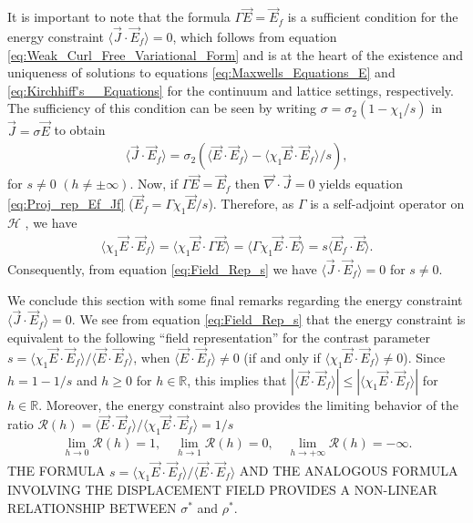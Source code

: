 \documentclass{cmslatex}
\begin{document}
It is important to note that the formula $\Gamma\vec{E}=\vec{E}_f$ is a
sufficient condition for the energy constraint
$\langle\vec{J}\cdot\vec{E}_f\rangle=0$, which follows from equation
\eqref{eq:Weak_Curl_Free_Variational_Form} and is at the heart of
the existence and uniqueness of solutions to equations
\eqref{eq:Maxwells_Equations_E} and 
\eqref{eq:Kirchhiff's__Equations} for the continuum and lattice
settings, respectively. The sufficiency of this condition can be seen
by writing $\sigma=\sigma_2(1-\chi_1/s)$ in $\vec{J}=\sigma\vec{E}$ to obtain       
% 
\begin{align}\label{eq:Field_Rep_s}
  \langle\vec{J}\cdot\vec{E}_f\rangle=\sigma_2(\langle\vec{E}\cdot\vec{E}_f\rangle-\langle\chi_1\vec{E}\cdot\vec{E}_f\rangle/s),
\end{align}
%
for $s\neq0$ $(h\neq\pm\infty)$. Now, if $\Gamma\vec{E}=\vec{E}_f$ then
$\vec{\nabla}\cdot\vec{J}=0$ yields equation \eqref{eq:Proj_rep_Ef_Jf}
($\vec{E}_f=\Gamma\chi_1\vec{E}/s$). Therefore, as $\Gamma$ is a self-adjoint
operator on $\mathscr{H}$ \cite{Golden:CMP-473}, we have     
%
\begin{align}\label{eq:Suff_Cond}
  \langle\chi_1\vec{E}\cdot\vec{E}_f\rangle=\langle\chi_1\vec{E}\cdot\Gamma\vec{E}\rangle
                    =\langle\Gamma\chi_1\vec{E}\cdot\vec{E}\rangle
                    =s\langle\vec{E}_f\cdot\vec{E}\rangle.
\end{align}
%
Consequently, from equation \eqref{eq:Field_Rep_s}
we have $\langle\vec{J}\cdot\vec{E}_f\rangle=0$ for $s\neq0$.

We conclude this section with some final remarks regarding the energy
constraint $\langle\vec{J}\cdot\vec{E}_f\rangle=0$. We see from equation
\eqref{eq:Field_Rep_s} that the energy constraint is equivalent to the
following ``field representation'' for the contrast parameter
$s=\langle\chi_1\vec{E}\cdot\vec{E}_f\rangle/\langle\vec{E}\cdot\vec{E}_f\rangle$, when
$\langle\vec{E}\cdot\vec{E}_f\rangle\neq0$ (if and only if
$\langle\chi_1\vec{E}\cdot\vec{E}_f\rangle\neq0$). Since $h=1-1/s$ and $h\geq0$ for
$h\in\mathbb{R}$, this implies that
$|\langle\vec{E}\cdot\vec{E}_f\rangle|\leq|\langle\chi_1\vec{E}\cdot\vec{E}_f\rangle|$ for
$h\in\mathbb{R}$. Moreover, the energy constraint also provides the
limiting behavior of the ratio
$\mathcal{R}(h)=\langle\vec{E}\cdot\vec{E}_f\rangle/\langle\chi_1\vec{E}\cdot\vec{E}_f\rangle=1/s$
%
\begin{align*}
  \lim_{h\to0}\mathcal{R}(h)=1, \quad
  \lim_{h\to1}\mathcal{R}(h)=0, \quad
  \lim_{h\to+\infty}\mathcal{R}(h)=-\infty.
\end{align*}
%
THE FORMULA $s=\langle\chi_1\vec{E}\cdot\vec{E}_f\rangle/\langle\vec{E}\cdot\vec{E}_f\rangle$ AND THE
ANALOGOUS FORMULA INVOLVING THE DISPLACEMENT FIELD PROVIDES A
NON-LINEAR RELATIONSHIP BETWEEN $\sigma^*$ and $\rho^*$.
\end{document}
